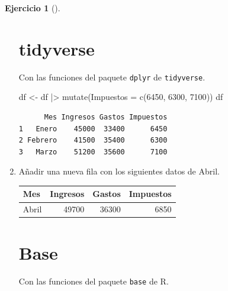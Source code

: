 \documentclass[
  spanish,
  a4paper,
]{scrreport}
\newenvironment{Shaded}{\begin{snugshade}}{\end{snugshade}}
\newcommand{\AttributeTok}[1]{\textcolor[rgb]{0.40,0.45,0.13}{#1}}
\newcommand{\DecValTok}[1]{\textcolor[rgb]{0.68,0.00,0.00}{#1}}
\newcommand{\FunctionTok}[1]{\textcolor[rgb]{0.28,0.35,0.67}{#1}}
\newcommand{\NormalTok}[1]{\textcolor[rgb]{0.00,0.23,0.31}{#1}}
\newcommand{\OtherTok}[1]{\textcolor[rgb]{0.00,0.23,0.31}{#1}}
\newcommand{\SpecialCharTok}[1]{\textcolor[rgb]{0.37,0.37,0.37}{#1}}
\theoremstyle{definition}
\newtheorem{exercise}{Ejercicio}[chapter]
\theoremstyle{remark}
\begin{document}
\begin{exercise}[]
\begin{enumerate}
\begin{tcolorbox}
  \section{tidyverse}

  Con las funciones del paquete \texttt{dplyr} de \texttt{tidyverse}.

\begin{Shaded}
\begin{Highlighting}[]
\NormalTok{df }\OtherTok{\textless{}{-}}\NormalTok{ df }\SpecialCharTok{|\textgreater{}} \FunctionTok{mutate}\NormalTok{(}\AttributeTok{Impuestos =} \FunctionTok{c}\NormalTok{(}\DecValTok{6450}\NormalTok{, }\DecValTok{6300}\NormalTok{, }\DecValTok{7100}\NormalTok{))}
\NormalTok{df}
\end{Highlighting}
\end{Shaded}

\begin{verbatim}
      Mes Ingresos Gastos Impuestos
1   Enero    45000  33400      6450
2 Febrero    41500  35400      6300
3   Marzo    51200  35600      7100
\end{verbatim}

  \end{tcolorbox}
\item
  Añadir una nueva fila con los siguientes datos de Abril.

  \begin{longtable}[]{@{}lrrr@{}}
  \toprule\noalign{}
  Mes & Ingresos & Gastos & Impuestos \\
  \midrule\noalign{}
  \endhead
  \bottomrule\noalign{}
  \endlastfoot
  Abril & 49700 & 36300 & 6850 \\
  \end{longtable}

  \begin{tcolorbox}[enhanced jigsaw, colback=white, opacityback=0, title=\textcolor{quarto-callout-tip-color}{\faLightbulb}\hspace{0.5em}{Solución}, toprule=.15mm, titlerule=0mm, breakable, toptitle=1mm, colframe=quarto-callout-tip-color-frame, coltitle=black, opacitybacktitle=0.6, bottomrule=.15mm, arc=.35mm, colbacktitle=quarto-callout-tip-color!10!white, leftrule=.75mm, bottomtitle=1mm, rightrule=.15mm, left=2mm]

  \section{Base}

  Con las funciones del paquete \texttt{base} de R.


\end{tcolorbox}
\end{enumerate}
\end{exercise}
\end{document}
